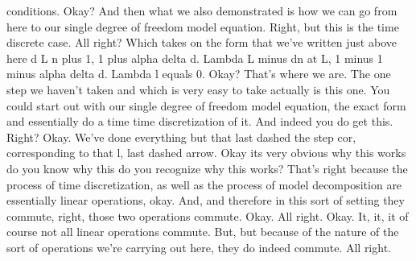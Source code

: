\documentclass[10pt]{article}
\begin{document}
conditions. Okay? And then what we also demonstrated is how we can go from here to our single degree of freedom model equation. Right, but this is the time discrete case. All right? Which takes on the form that we've written just above here d L n plus 1, 1 plus alpha delta d. Lambda L minus dn at L, 1 minus 1 minus alpha delta d. Lambda l equals 0. Okay? That's where we are. The one step we haven't taken and which is very easy to take actually is this one. You could start out with our single degree of freedom model equation, the exact form and essentially do a time time discretization of it. And indeed you do get this. Right? Okay. We've done everything but that last dashed the step cor, corresponding to that l, last dashed arrow. Okay its very obvious why this works do you know why this do you recognize why this works? That's right because the process of time discretization, as well as the process of model decomposition are essentially linear operations, okay. And, and therefore in this sort of setting they commute, right, those two operations commute. Okay. All right. Okay. It, it, it of course not all linear operations commute. But, but because of the nature of the sort of operations we're carrying out here, they do indeed commute. All right.
\end{document}
